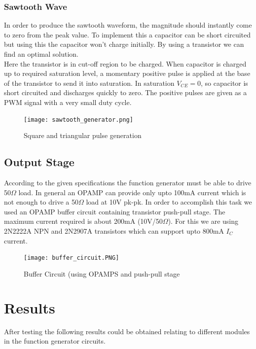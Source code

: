 \documentclass[11pt]{article}
\begin{document}
\begin{multicols}{2}
\subsubsection{Sawtooth Wave}

In order to produce the sawtooth waveform, the magnitude should instantly come to zero from the peak value. To implement this a capacitor can be short circuited but using this the capacitor won’t charge initially. By using a transistor we can find an optimal solution. \\
Here the transistor is in cut-off region to be charged. When capacitor is charged up to required saturation level, a momentary positive pulse is applied at the base of the transistor to send it into saturation. In saturation $V_{CE} = 0$, so capacitor is short circuited and discharges quickly to zero. The positive pulses are given as a PWM signal with a very small duty cycle.

\begin{figure}[H]
    \centering
    \texttt{[image: sawtooth\_generator.png]}
    \caption{Square and triangular pulse generation}
    \label{fig:mesh1}
\end{figure}

\subsection{Output Stage}
According to the given specifications the function generator must be able to drive 50\(\Omega\) load. In general an OPAMP can provide only upto 100mA current which is not enough to drive a 50\(\Omega\) load at 10V pk-pk. In order to accomplish this task we used an OPAMP buffer circuit containing transistor push-pull stage. The maximum current required is about 200mA (10V/50\(\Omega\)). For this we are using 2N2222A NPN and 2N2907A transistors which can support upto 800mA \(I_{C}\) current.

\begin{figure}[H]
    \centering
    \texttt{[image: buffer\_circuit.PNG]}
    \caption{Buffer Circuit (using OPAMPS and push-pull stage}
    \label{fig:mesh1}
\end{figure}

\section{Results}
After testing the following results could be obtained relating to different modules in the function generator circuits.


\end{multicols}
\end{document}
